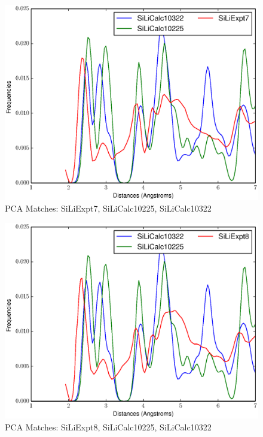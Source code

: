 \documentclass[12pt,letterpaper]{article}
\begin{document}
\begin{figure}[ht]
  \begin{center}
    \includegraphics[scale=0.8]{figs/PC3MatchSiLiExpt7-SiLiCalc10225-SiLiCalc10322.eps}
    \caption{PCA Matches: SiLiExpt7, SiLiCalc10225, SiLiCalc10322}
  \end{center}
\end{figure}

\begin{figure}[ht]
  \begin{center}
    \includegraphics[scale=0.8]{figs/PC3MatchSiLiExpt8-SiLiCalc10225-SiLiCalc10322.eps}
    \caption{PCA Matches: SiLiExpt8, SiLiCalc10225, SiLiCalc10322}
  \end{center}
\end{figure}
\clearpage
\end{document}
